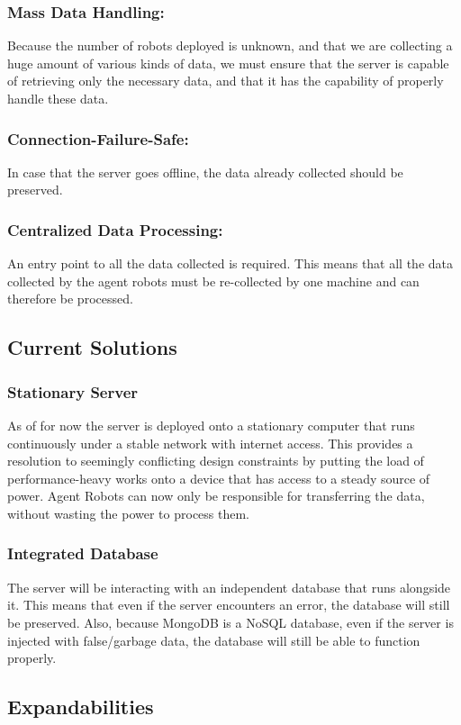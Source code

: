 \documentclass{article}
\begin{document}
\subsubsection{Mass Data Handling: } Because the number of robots deployed is unknown, and that we are collecting a huge amount of various kinds of data, we must ensure that the server
is capable of retrieving only the necessary data, and that it has the capability of properly handle these data.
\subsubsection{Connection-Failure-Safe: } In case that the server goes offline, the data already collected should be preserved. 
\subsubsection{Centralized Data Processing: } An entry point to all the data collected is required. This means that all the data collected by the agent robots must be re-collected by one 
machine and can therefore be processed.

\subsection{Current Solutions}
\subsubsection{Stationary Server} As of for now the server is deployed onto a stationary computer that runs continuously under a stable network with internet access.
This provides a resolution to seemingly conflicting design constraints by putting the load of performance-heavy works onto a device that has access to a steady source of power.
Agent Robots can now only be responsible for transferring the data, without wasting the power to process them.
\subsubsection{Integrated Database} The server will be interacting with an independent database that runs alongside it. This means that even if the server encounters an error, the database will still be preserved.
Also, because MongoDB is a NoSQL database, even if the server is injected with false/garbage data, the database will still be able to function properly.


\subsection{Expandabilities}
\end{document}
